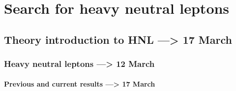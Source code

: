 \part {Search for heavy neutral leptons}

\chapter{Theory introduction to HNL --->  17 March} %

\label{Chapter3} %

\section{Heavy neutral leptons  --->  12 March}
\subsection{Previous and current results ---> 17 March}
